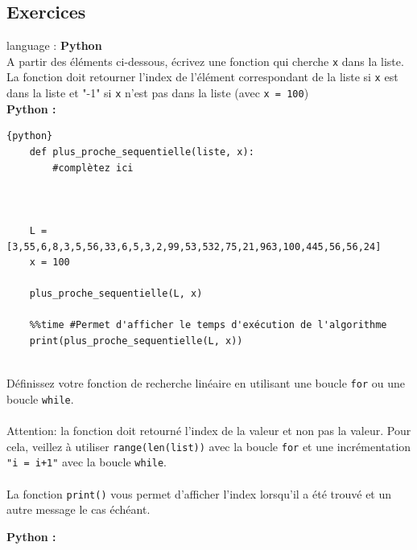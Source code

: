 \subsection{Exercices}

\begin{Exercice}[5 minutes] language : \textbf{Python}\\

A partir des éléments ci-dessous, écrivez une fonction qui cherche \lstinline{x} dans la liste.\\La fonction doit retourner l'index de l'élément correspondant de la liste si \lstinline{x} est dans la liste et "-1" si \lstinline{x} n'est pas dans la liste (avec \lstinline{x = 100})\\

\textbf{Python :}
\begin{lstlisting}{python}
    def plus_proche_sequentielle(liste, x):
        #complètez ici
        
    
    
    L = [3,55,6,8,3,5,56,33,6,5,3,2,99,53,532,75,21,963,100,445,56,56,24]
    x = 100
    
    plus_proche_sequentielle(L, x)
        
    %%time #Permet d'afficher le temps d'exécution de l'algorithme 
    print(plus_proche_sequentielle(L, x))
    
\end{lstlisting}

\begin{conseil}
    Définissez votre fonction de recherche linéaire en utilisant une boucle \lstinline{for} ou une boucle \lstinline{while}.\\\\
    Attention: la fonction doit retourné l'index de la valeur et non pas la valeur. Pour cela, veillez à utiliser \lstinline{range(len(list))} avec la boucle \lstinline{for} et une incrémentation \lstinline{"i = i+1"} avec la boucle \lstinline{while}.\\\\
    La fonction \lstinline{print()} vous permet d'afficher l'index lorsqu'il a été trouvé et un autre message le cas échéant. 
\end{conseil}
    
\begin{solution}
\textbf{Python :}
    
    
\end{solution}

\end{Exercice}

